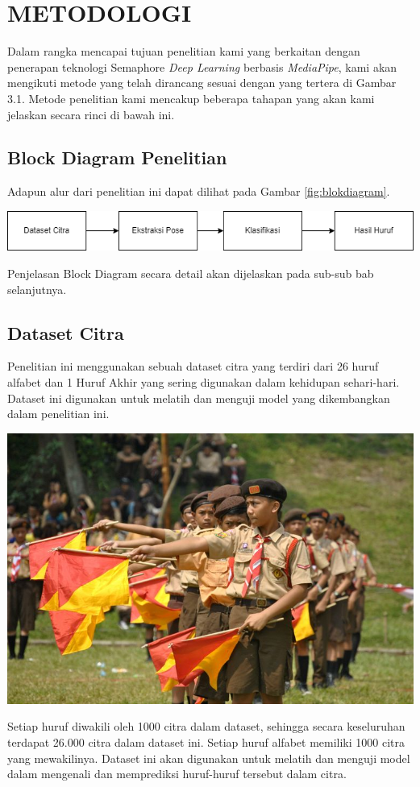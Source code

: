 \chapter{METODOLOGI}


Dalam rangka mencapai tujuan penelitian kami yang berkaitan dengan penerapan teknologi Semaphore \textit{Deep Learning} berbasis \textit{MediaPipe}, kami akan mengikuti metode yang telah dirancang sesuai dengan yang tertera di Gambar 3.1. Metode penelitian kami mencakup beberapa tahapan yang akan kami jelaskan secara rinci di bawah ini.

\section{Block Diagram Penelitian}
Adapun alur dari penelitian ini dapat dilihat pada Gambar \ref{fig:blokdiagram}.
\begin{center}
	\includegraphics[width=1.0\linewidth]{gambar/metodologi_kerja.png}
	\label{fig:blokdiagram}
\end{center}

Penjelasan Block Diagram secara detail akan dijelaskan pada sub-sub bab selanjutnya.

\section{Dataset Citra}

Penelitian ini menggunakan sebuah dataset citra yang terdiri dari 26 huruf alfabet dan 1 Huruf Akhir yang sering digunakan dalam kehidupan sehari-hari. Dataset ini digunakan untuk melatih dan menguji model yang dikembangkan dalam penelitian ini.
\begin{center}
	\includegraphics[width=0.7\linewidth]{gambar/bener/kerja-semaphore.jpg}
	\label{fig:poseAbjadBISINDO}
\end{center}
Setiap huruf diwakili oleh 1000 citra dalam dataset, sehingga secara keseluruhan terdapat 26.000 citra dalam dataset ini. Setiap huruf alfabet memiliki 1000 citra yang mewakilinya. Dataset ini akan digunakan untuk melatih dan menguji model dalam mengenali dan memprediksi huruf-huruf tersebut dalam citra.


